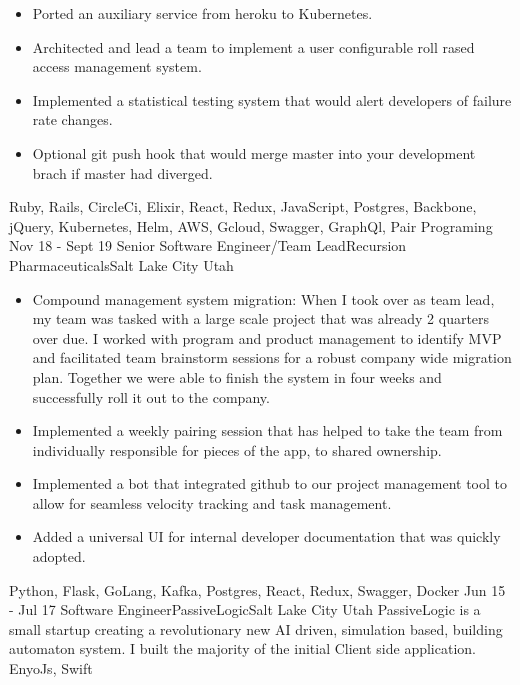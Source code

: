 \begin{experiences}
{\begin{itemize}
                        \item Ported an auxiliary service from heroku to Kubernetes.
                        \item Architected and lead a team to implement a user configurable roll rased access management system. 
                        \item Implemented a statistical testing system that would alert developers of failure rate changes.
                        \item Optional git push hook that would merge master into your development brach if master had diverged.
                      \end{itemize}
                    }
                    {Ruby, Rails, CircleCi, Elixir, React, Redux, JavaScript, Postgres, Backbone, jQuery, Kubernetes, Helm, AWS, Gcloud, Swagger, GraphQl, Pair Programing}
  \emptySeparator
  \experience
    {Nov 18 - Sept 19} {Senior Software Engineer/Team Lead}{Recursion Pharmaceuticals}{Salt Lake City Utah}
    {}    {
                      \begin{itemize}
                        \item Compound management system migration:
                        When I took over as team lead, my team was tasked with a large scale project that was already 2 quarters over due. I worked with program and product management to identify MVP and facilitated team brainstorm sessions for a robust company wide migration plan. Together we were able to finish the system in four weeks and successfully roll it out to the company.
                        \item Implemented a weekly pairing session that has helped to take the team from individually responsible for pieces of the app, to shared ownership.
                        \item Implemented a bot that integrated github to our project management tool to allow for seamless velocity tracking and task management.
                        \item Added a universal UI for internal developer documentation that was quickly adopted.
                      \end{itemize}
                    }
                    {Python, Flask, GoLang, Kafka, Postgres, React, Redux, Swagger, Docker}
  \emptySeparator
  \experience
  {Jun 15 - Jul 17}  {Software Engineer}{PassiveLogic}{Salt Lake City Utah}
  {}  {PassiveLogic is a small startup creating a revolutionary new AI driven, simulation based, building automaton system. I built the majority of the initial Client side application.}
      {EnyoJs, Swift}
  \emptySeparator
\end{experiences}
